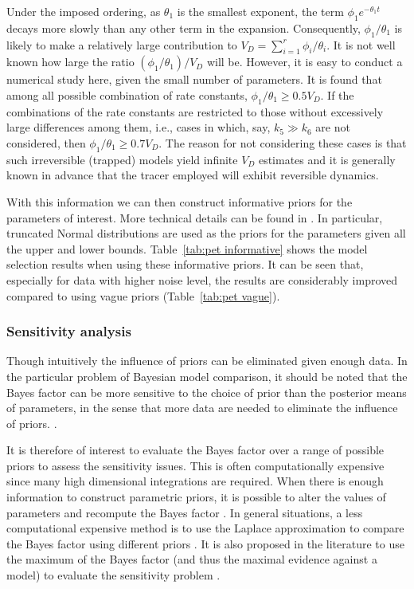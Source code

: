Under the imposed ordering, as $\theta_1$ is the smallest exponent, the term
$\phi_1e^{-\theta_1 t}$ decays more slowly than any other term in the
expansion. Consequently, $\phi_1/\theta_1$ is likely to make a relatively
large contribution to $V_D = \sum_{i=1}^r \phi_i/\theta_i$. It is not well
known how large the ratio $(\phi_1/\theta_1)/V_D$ will be. However, it is
easy to conduct a numerical study here, given the small number of parameters.
It is found that among all possible combination of rate constants, $\phi_1/
\theta_1 \ge 0.5 V_D$. If the combinations of the rate constants are
restricted to those without excessively large differences among them, i.e.,
cases in which, say, $k_5 \gg k_6$ are not considered, then $\phi_1/\theta_1
\ge 0.7 V_D$. The reason for not considering these cases is that such
irreversible (trapped) models yield infinite $V_D$ estimates and it is
generally known in advance that the tracer employed will exhibit reversible
dynamics.

With this information we can then construct informative priors for the
parameters of interest. More technical details can be found in
\cite{Zhou2013}. In particular, truncated Normal distributions are used as
the priors for the parameters given all the upper and lower bounds.
Table~\ref{tab:pet informative} shows the model selection results when using
these informative priors. It can be seen that, especially for data with
higher noise level, the results are considerably improved compared to using
vague priors (Table~\ref{tab:pet vague}).



\subsubsection{Sensitivity analysis}
\label{ssub:Sensitivity analysis}

Though intuitively the influence of priors can be eliminated given enough
data. In the particular problem of Bayesian model comparison, it should be
noted that the Bayes factor can be more sensitive to the choice of prior than
the posterior means of parameters, in the sense that more data are needed to
eliminate the influence of priors. \cite{Kass:1993vy,Kass:1995vb}.

It is therefore of interest to evaluate the Bayes factor over a range of
possible priors to assess the sensitivity issues. This is often
computationally expensive since many high dimensional integrations are
required. When there is enough information to construct parametric priors, it
is possible to alter the values of parameters and recompute the Bayes factor
\cite{McCulloch:1991hj}. In general situations, a less computational
expensive method is to use the Laplace approximation to compare the Bayes
factor using different priors \cite{Kass:1992tz}. It is also proposed in the
literature to use the maximum of the Bayes factor (and thus the maximal
evidence against a model) to evaluate the sensitivity problem
\cite{Berger:1987iq}.

